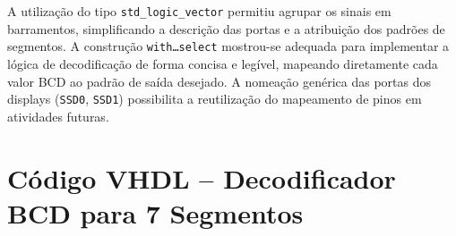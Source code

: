 \documentclass[12pt,a4paper, brazil]{article}
\begin{document}
A utilização do tipo \texttt{std\_logic\_vector} permitiu agrupar os sinais em barramentos, simplificando a descrição das portas e a atribuição dos padrões de segmentos. A construção \texttt{with\ldots select} mostrou-se adequada para implementar a lógica de decodificação de forma concisa e legível, mapeando diretamente cada valor BCD ao padrão de saída desejado. A nomeação genérica das portas dos displays (\texttt{SSD0}, \texttt{SSD1}) possibilita a reutilização do mapeamento de pinos em atividades futuras.

\appendix

\newpage
\section{Código VHDL -- Decodificador BCD para 7 Segmentos}
\label{ap:codigo}
\end{document}
